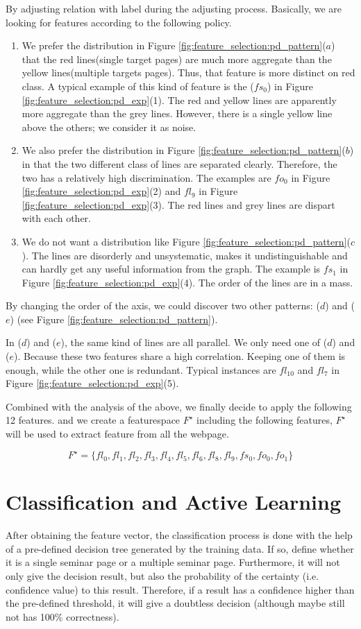 By adjusting relation with label during the adjusting process. Basically, we are looking for features according to the following policy.
\begin{enumerate}
  \item We prefer the distribution in Figure \ref{fig:feature_selection:pd_pattern}($a$) that the red lines(single target pages) are much more aggregate than the yellow lines(multiple targets pages). Thus, that feature is more distinct on red class. A typical example of this kind of feature is the ($fs_0$) in Figure \ref{fig:feature_selection:pd_exp}(1). The red and yellow lines are apparently more aggregate than the grey lines. However, there is a single yellow line above the others; we consider it as noise.
  \item We also prefer the distribution in Figure \ref{fig:feature_selection:pd_pattern}($b$) in that the two different class of lines are separated clearly. Therefore, the two has a relatively high discrimination. The examples are $fo_0$ in Figure \ref{fig:feature_selection:pd_exp}(2) and $fl_9$ in Figure \ref{fig:feature_selection:pd_exp}(3). The red lines and grey lines are dispart with each other.
  \item We do not want a distribution like Figure \ref{fig:feature_selection:pd_pattern}($c$). The lines are disorderly and unsystematic, makes it undistinguishable and can hardly get any useful information from the graph. The example is $fs_1$ in Figure \ref{fig:feature_selection:pd_exp}(4). The order of the lines are in a mass.
\end{enumerate}

By changing the order of the axis, we could discover two other patterns: ($d$) and ($e$) (see Figure \ref{fig:feature_selection:pd_pattern}).

In ($d$) and ($e$), the same kind of lines are all parallel. We only need one of ($d$) and ($e$). Because these two features share a high correlation. Keeping one of them is enough, while the other one is redundant. Typical instances are $fl_{10}$ and $fl_7$ in Figure \ref{fig:feature_selection:pd_exp}(5).

Combined with the analysis of the above, we finally decide to apply the following 12 features. and we create a featurespace $F^\star $ including the following features, $F^\star $ will be used to extract feature from all the webpage.

$$F^\star = \{ fl_0,fl_1,fl_2,fl_3,fl_4,fl_5,fl_6,fl_8,fl_9,fs_0,fo_0,fo_1 \} $$


\section{Classification and Active Learning}
After obtaining the feature vector, the classification process is done with the help of a pre-defined decision tree generated by the training data. If so, define whether it is a single seminar page or a multiple seminar page. Furthermore, it will not only give the decision result, but also the probability of the certainty (i.e. confidence value) to this result. Therefore, if a result has a confidence higher than the pre-defined threshold, it will give a doubtless decision (although maybe still not has 100\% correctness). 

